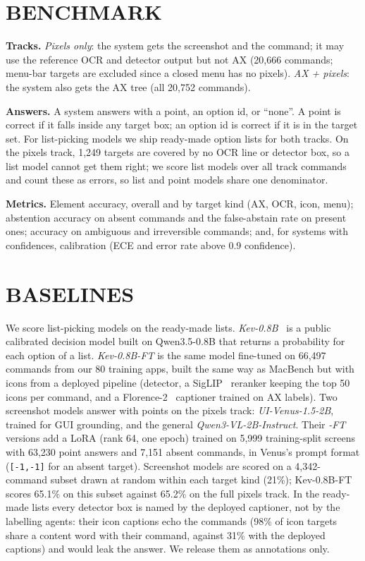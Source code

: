\documentclass[a4paper,twoside]{article}
\newcommand{\bench}{MacBench}
\begin{document}
\section{\uppercase{Benchmark}}
\textbf{Tracks.} \emph{Pixels only}: the system gets the screenshot and the command; it may use the reference OCR and detector output but not AX (20,666 commands; menu-bar targets are excluded since a closed menu has no pixels). \emph{AX + pixels}: the system also gets the AX tree (all 20,752 commands).

\textbf{Answers.} A system answers with a point, an option id, or ``none''. A point is correct if it falls inside any target box; an option id is correct if it is in the target set. For list-picking models we ship ready-made option lists for both tracks. On the pixels track, 1,249 targets are covered by no OCR line or detector box, so a list model cannot get them right; we score list models over all track commands and count these as errors, so list and point models share one denominator.

\textbf{Metrics.} Element accuracy, overall and by target kind (AX, OCR, icon, menu); abstention accuracy on absent commands and the false-abstain rate on present ones; accuracy on ambiguous and irreversible commands; and, for systems with confidences, calibration (ECE and error rate above 0.9 confidence).

\section{\uppercase{Baselines}}
We score list-picking models on the ready-made lists. \emph{Kev-0.8B}~\cite{kev} is a public calibrated decision model built on Qwen3.5-0.8B that returns a probability for each option of a list. \emph{Kev-0.8B-FT} is the same model fine-tuned on 66,497 commands from our 80 training apps, built the same way as \bench{} but with icons from a deployed pipeline (detector, a SigLIP~\cite{siglip} reranker keeping the top 50 icons per command, and a Florence-2~\cite{florence2} captioner trained on AX labels). Two screenshot models answer with points on the pixels track: \emph{UI-Venus-1.5-2B}, trained for GUI grounding, and the general \emph{Qwen3-VL-2B-Instruct}. Their \emph{-FT} versions add a LoRA (rank 64, one epoch) trained on 5,999 training-split screens with 63,230 point answers and 7,151 absent commands, in Venus's prompt format (\texttt{[-1,-1]} for an absent target). Screenshot models are scored on a 4,342-command subset drawn at random within each target kind (21\%); Kev-0.8B-FT scores 65.1\% on this subset against 65.2\% on the full pixels track. In the ready-made lists every detector box is named by the deployed captioner, not by the labelling agents: their icon captions echo the commands (98\% of icon targets share a content word with their command, against 31\% with the deployed captions) and would leak the answer. We release them as annotations only.
\end{document}
